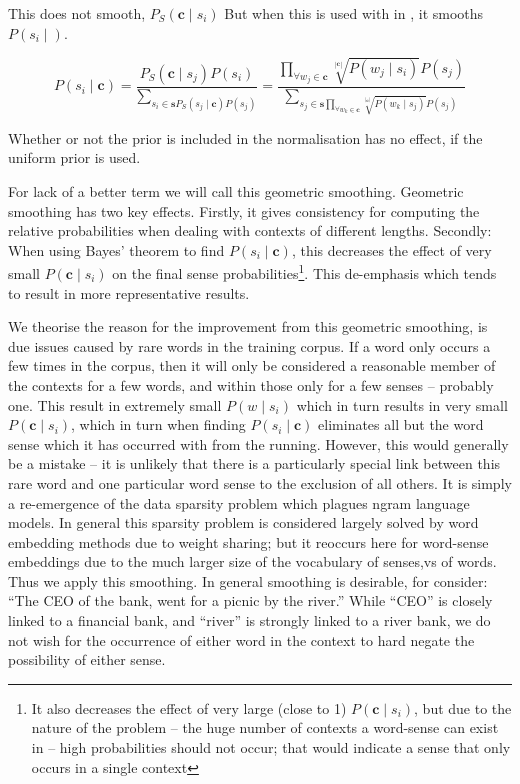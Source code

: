 \documentclass{sig-alternate}
\renewcommand{\c}{\mathbf{c}}
\newcommand{\s}{\mathbf{s}}
\begin{document}
This does not smooth, $P_S(\c \mid s_{i})$
But when this is used with in , it smooths $P(s_{i} \mid )$.

\begin{equation} \label{eq:generalwsdsmoothed}
P(s_{i} \mid \c) = \dfrac{P_S(\c \mid s_{j})P(s_{i})}{\sum_{s_{i}\in\s P_S(s_{j} \mid \c)P(s_{j})}} = \dfrac{\prod_{\forall w_{j}\in\c}\sqrt[|\c|]{P(w_{j} \mid s_{i})}P(s_{j})}{\sum_{s_{j}\in\s \prod_{\forall w_{k}\in\c}\sqrt[|\c|]{P(w_{k} \mid s_{j})} P(s_{j})}} 
\end{equation}


Whether or not the prior is included in the normalisation has no effect, if the uniform prior is used.


For lack of a better term we will call this geometric smoothing. Geometric smoothing has two key effects. Firstly, it gives consistency for computing the relative  probabilities when dealing with contexts of different lengths. Secondly: When using Bayes' theorem to find $P(s_{i} \mid \c)$, this decreases the effect of very small $P(\c \mid s_{i})$ on the final sense probabilities\footnote{It also decreases the effect of very large (close to 1) $P(\c \mid s_{i})$, but due to the nature of the problem -- the huge number of contexts a word-sense can exist in -- high probabilities should not occur; that would indicate a sense that only occurs in a single context}. This de-emphasis which tends to result in more representative results.

We theorise the reason for the improvement from this geometric smoothing, is due issues caused by rare words in the training corpus. If a word only occurs a few times in the corpus, then it will only be considered a reasonable member of the contexts for a few words, and within those only for a few senses -- probably one. This result in extremely small $P(w \mid s_i)$ which in turn results in very small $P(\c \mid s_i)$, which in turn when finding $P(s_{i} \mid \c)$ eliminates all but the word sense which it has occurred with from the running. However, this would generally be a mistake -- it is unlikely that there is a particularly special link between this rare word and one particular word sense to the exclusion of all others. It is simply a re-emergence of the data sparsity problem which plagues ngram language models. In general this sparsity problem is considered largely solved by word embedding methods due to weight sharing; but it reoccurs here for word-sense embeddings due to the much larger size of the vocabulary of senses,vs of words. Thus we apply this smoothing. In general smoothing is desirable, for consider: \enquote{The CEO of the bank, went for a picnic by the river.} While \enquote{CEO} is closely linked to a financial bank, and \enquote{river} is strongly linked to a river bank, we do not wish for the occurrence of either word in the context to hard negate the possibility of either sense.
\end{document}
